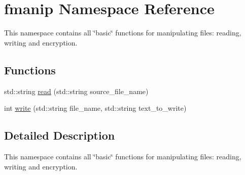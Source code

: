 \hypertarget{namespacefmanip}{\section{fmanip Namespace Reference}
\label{namespacefmanip}
}


This namespace contains all \char`\"{}basic\char`\"{} functions for manipulating files\+: reading, writing and encryption.  


\subsection*{Functions}
\begin{DoxyCompactItemize}
\item 
std\+::string \hyperlink{namespacefmanip_a66b745d158684878cd4c8bc815c74849}{read} (std\+::string source\+\_\+file\+\_\+name)
\item 
int \hyperlink{namespacefmanip_af5012379267d8164747803e2ecaa1205}{write} (std\+::string file\+\_\+name, std\+::string text\+\_\+to\+\_\+write)
\end{DoxyCompactItemize}


\subsection{Detailed Description}
This namespace contains all \char`\"{}basic\char`\"{} functions for manipulating files\+: reading, writing and encryption. 

